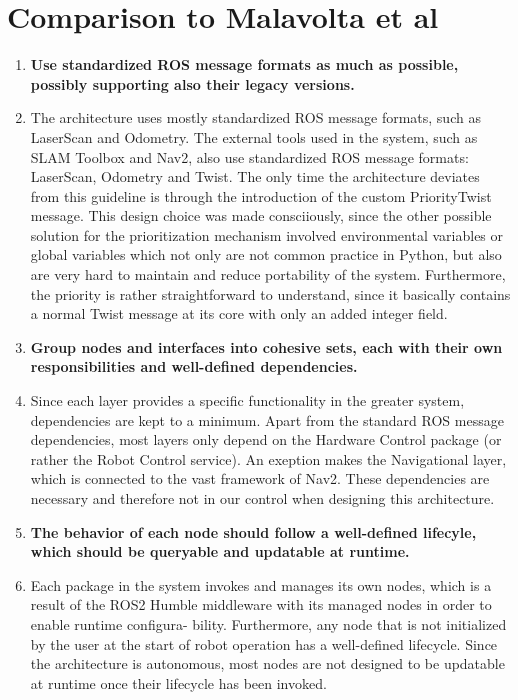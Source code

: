 \documentclass[%
paper=A4,               %
twoside=true,           %
openright,              %
11pt,                   %
bibliography=totoc,     %
titlepage=on,           %
DIV=12,                 %
BCOR=1.5cm,             %
parskip=half,            %
final
]{scrreprt}
\begin{document}
	\section{Comparison to Malavolta et al}
	\begin{enumerate}[leftmargin=9mm, align=left]
		\item \textbf{Use standardized ROS message formats as much as possible, possibly supporting also their legacy versions.} 
		\item[]The architecture uses mostly standardized ROS message formats, such as LaserScan and Odometry. The external tools used in the system, such as SLAM Toolbox and Nav2, also use standardized ROS message formats: LaserScan, Odometry and Twist. The only time the architecture deviates from this guideline is through the introduction of the custom PriorityTwist message. This design choice was made consciiously, since the other possible solution for the prioritization mechanism involved environmental variables or global variables which not only are not common practice in Python, but also are very hard to maintain and reduce portability of the system. Furthermore, the priority is rather straightforward to understand, since it basically contains a normal Twist message at its core with only an added integer field.
		
		\item \textbf{Group nodes and interfaces into cohesive sets, each with their own responsibilities and well-defined dependencies.} 
		\item[]Since each layer provides a specific functionality in the greater system, dependencies are kept to a minimum. Apart from the standard ROS message dependencies, most layers only depend on the Hardware Control package (or rather the Robot Control service). An exeption makes the Navigational layer, which is connected to the vast framework of Nav2. These dependencies are necessary and therefore not in our control when designing this architecture.
		\item \textbf{The behavior of each node should follow a well-defined lifecyle, which should be queryable and updatable at runtime.} 
		\item[]
		Each package in the system invokes and manages its own nodes, which is a result of the ROS2 Humble middleware with its managed nodes in order to enable runtime configura- bility. Furthermore, any node that is not initialized by the user at the start of robot operation has a well-defined lifecycle. Since the architecture is autonomous, most nodes are not designed to be updatable at runtime once their lifecycle has been invoked.
		

\end{enumerate}
\end{document}

